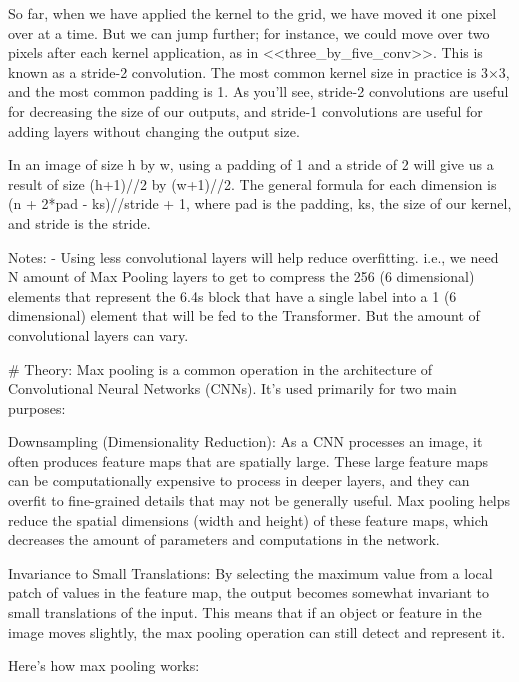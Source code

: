 So far, when we have applied the kernel to the grid, we have moved it one pixel over at a time. But we 
can jump further; for instance, we could move over two pixels after each kernel application, as 
in <<three_by_five_conv>>. This is known as a stride-2 convolution. The most common kernel size in 
practice is 3×3, and the most common padding is 1. As you'll see, stride-2 convolutions are useful 
for decreasing the size of our outputs, and stride-1 convolutions are useful for adding layers 
without changing the output size.



In an image of size h by w, using a padding of 1 and a stride of 2 will give us a result of size (h+1)//2 by (w+1)//2. 
The general formula for each dimension is (n + 2*pad - ks)//stride + 1, where pad is the padding, ks, the size of 
our kernel, and stride is the stride.




Notes: 
- Using less convolutional layers will help reduce overfitting. i.e., we need N amount of 
Max Pooling layers to get to compress the 256 (6 dimensional) elements that represent the 6.4s block that 
have a single label into a 1 (6 dimensional) element that will be fed to the Transformer. But the amount of convolutional
layers can vary. 








# Theory: 
Max pooling is a common operation in the architecture of Convolutional Neural Networks (CNNs). It's used primarily for two main purposes:

    Downsampling (Dimensionality Reduction): As a CNN processes an image, it often produces feature maps that are spatially large. These large feature maps can be computationally expensive to process in deeper layers, and they can overfit to fine-grained details that may not be generally useful. Max pooling helps reduce the spatial dimensions (width and height) of these feature maps, which decreases the amount of parameters and computations in the network.

    Invariance to Small Translations: By selecting the maximum value from a local patch of values in the feature map, the output becomes somewhat invariant to small translations of the input. This means that if an object or feature in the image moves slightly, the max pooling operation can still detect and represent it.

Here's how max pooling works:

